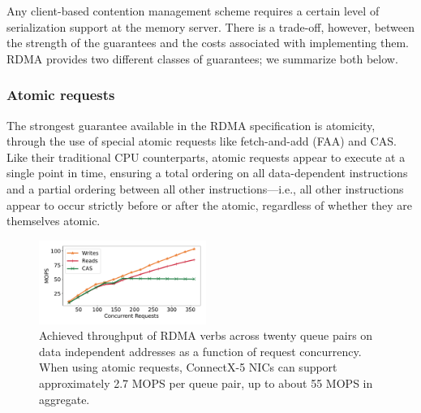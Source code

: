 Any client-based contention management scheme requires a certain level
of serialization support at the memory server.  There is a trade-off,
however, between the strength of the guarantees and the costs
associated with implementing them.  RDMA provides two different
classes of guarantees; we summarize both below.

\subsubsection{Atomic requests}

The strongest guarantee available in the RDMA specification is atomicity,
through the use of special atomic requests like fetch-and-add (FAA) and CAS.
Like their traditional CPU counterparts, atomic requests appear to execute at a
single point in time, ensuring a total ordering on all data-dependent
instructions and a partial ordering between all other instructions---i.e., all
other instructions appear to occur strictly before or after the atomic,
regardless of whether they are themselves atomic.

\begin{figure}[t]
  \includegraphics[width=0.485\textwidth]{fig/rdma_concur.pdf}

    \caption{Achieved throughput of RDMA verbs across twenty queue pairs on data
    independent addresses as a function of request concurrency.  When using
    atomic requests, ConnectX-5 NICs can support approximately 2.7 MOPS per
    queue pair, up to about 55 MOPS in aggregate.}

    \label{fig:rdma_concur}
\end{figure}


